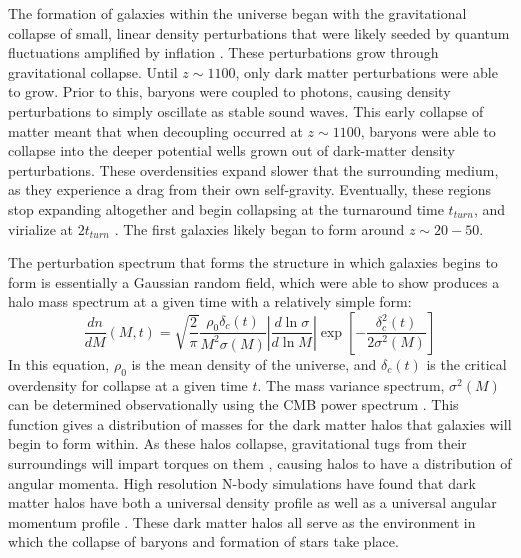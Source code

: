 The formation of galaxies within the universe began with the gravitational
collapse of small, linear density perturbations that were likely seeded by
quantum fluctuations amplified by inflation
\citep{Guth1981,Linde1982}.  These perturbations grow through
gravitational collapse.  Until $z\sim1100$, only dark matter perturbations were
able to grow.  Prior to this, baryons were coupled to photons, causing density
perturbations to simply oscillate as stable sound waves.  This early collapse
of matter meant that when decoupling occurred at $z\sim1100$, baryons were able
to collapse into the deeper potential wells grown out of dark-matter density
perturbations.  These overdensities expand slower that the surrounding medium,
as they experience a drag from their own self-gravity.  Eventually, these
regions stop expanding altogether and begin collapsing at the turnaround time
$t_{turn}$, and virialize at $2t_{turn}$ \citep{Peebles1980}. The first
galaxies likely began to form around $z\sim20-50$.

The perturbation spectrum that forms the structure in which galaxies begins to
form is essentially a Gaussian random field, which \citet{Press1974} were able
to show produces a halo mass spectrum at a given time with a relatively simple form:
\begin{equation}
    \frac{dn}{dM}(M,t) =
    \sqrt{\frac{2}{\pi}}\frac{\rho_0\delta_c(t)}{M^2\sigma(M)} 
    \left\lvert\frac{d\ln{\sigma}}{d\ln{M}}\right\rvert
    \exp{\left[-\frac{\delta^2_c(t)}{2\sigma^2(M)}\right]}
\end{equation}
In this equation, $\rho_0$ is the mean density of the universe, and
$\delta_c(t)$ is the critical overdensity for collapse at a given time $t$.  The
mass variance spectrum, $\sigma^2(M)$ can be determined observationally using
the CMB power spectrum \citep{Fixsen1996,Spergel2003,Planck2015}.  This function
gives a distribution of masses for the dark matter halos that galaxies will
begin to form within.  As these halos collapse, gravitational tugs from their
surroundings will impart torques on them \citep{Barnes1987}, causing halos to
have a distribution of angular momenta.  High resolution N-body simulations have
found that dark matter halos have both a universal density profile
\citep{Navarro1996,Merritt2006} as well as a universal angular momentum profile
\citep{Bullock2001}.  These dark matter halos all serve as the environment in
which the collapse of baryons and formation of stars take place.

